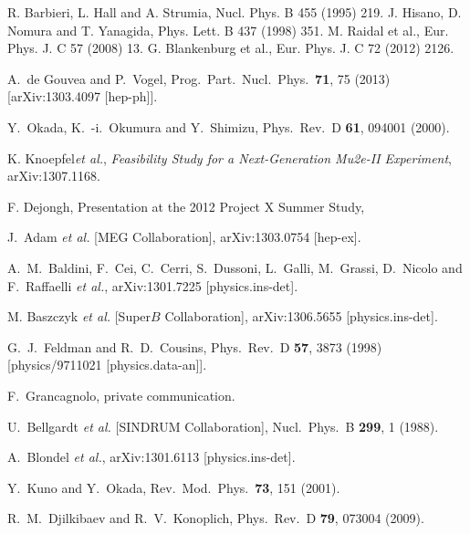 \begin{thebibliography}{9}

  R. Barbieri, L. Hall and A. Strumia, Nucl. Phys. B 455
(1995) 219.
J. Hisano, D. Nomura and T. Yanagida, Phys. Lett.
B 437 (1998) 351.
M. Raidal et al., Eur. Phys. J. C 57 (2008) 13.
G. Blankenburg et al., Eur. Phys. J. C 72 (2012) 2126.

  A.~de Gouvea and P.~Vogel,
  Prog.\ Part.\ Nucl.\ Phys.\  {\bf 71}, 75 (2013)
  [arXiv:1303.4097 [hep-ph]].
  
    Y.~Okada, K.~-i.~Okumura and Y.~Shimizu, Phys.\ Rev.\ D {\bf 61}, 094001 (2000).
  
K. Knoepfel{\it  et al.},  {\it{Feasibility Study for a Next-Generation Mu2e-II Experiment}}, arXiv:1307.1168.

F. Dejongh, Presentation at the 2012 Project X Summer Study,
\hfill{}

 J.~Adam {\it et al.}  [MEG Collaboration],
  arXiv:1303.0754 [hep-ex].

 A.~M.~Baldini, F.~Cei, C.~Cerri, S.~Dussoni, L.~Galli, M.~Grassi, D.~Nicolo and F.~Raffaelli {\it et al.},
  arXiv:1301.7225 [physics.ins-det].

M. Baszczyk {\it et al.} [Super$B$ Collaboration],
arXiv:1306.5655 [physics.ins-det].

  G.~J.~Feldman and R.~D.~Cousins,
  Phys.\ Rev.\ D {\bf 57}, 3873 (1998)
  [physics/9711021 [physics.data-an]].
  
 F.~Grancagnolo, private communication.

  U.~Bellgardt {\it et al.}  [SINDRUM Collaboration], Nucl.\ Phys.\ B {\bf 299}, 1 (1988).

 A.~Blondel {\it et al.}, arXiv:1301.6113 [physics.ins-det].

 Y.~Kuno and Y.~Okada, Rev.\ Mod.\ Phys.\  {\bf 73}, 151 (2001).

 R.~M.~Djilkibaev and R.~V.~Konoplich, Phys.\ Rev.\ D {\bf 79}, 073004 (2009).

\end{thebibliography}
